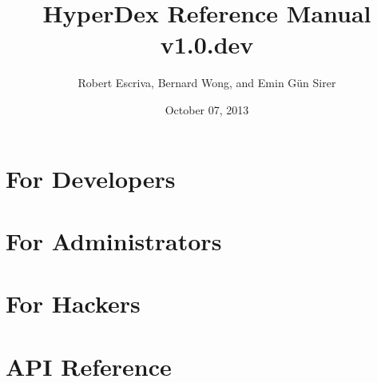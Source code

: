 \documentclass[10pt,oneside]{book}
\title{HyperDex Reference Manual v1.0.dev}
\date{October 07, 2013}
\author{Robert Escriva, Bernard Wong, and Emin Gün Sirer}
\begin{document}
\frontmatter
\maketitle
\tableofcontents

\mainmatter




\part{For Developers}
\label{part:for-developers}






\part{For Administrators}
\label{part:for-admins}



\part{For Hackers}
\label{part:for-hackers}


\part{API Reference}
\label{part:api-ref}


\backmatter


\end{document}
